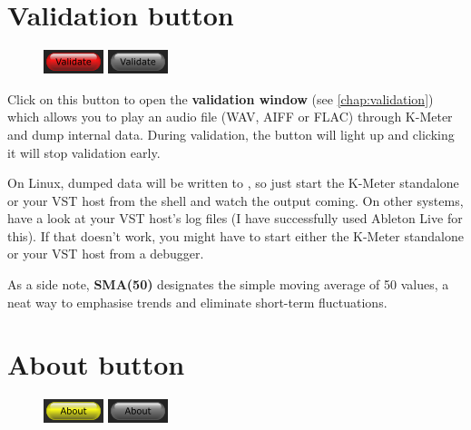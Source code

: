\section{Validation button}
\label{sec:validation_button}

\begin{figure}
  \includegraphics[scale=\screenshotscale,clip]{include/images/button_validate_on.png}
  \newline \vspace{-0.9\baselineskip}
  \includegraphics[scale=\screenshotscale,clip]{include/images/button_validate_off.png}
\end{figure}

Click on this button to open the \textbf{validation window} (see
\ref{chap:validation}) which allows you to play an audio file (WAV,
AIFF or FLAC) through K-Meter and dump internal data.  During
validation, the button will light up and clicking it will stop
validation early.

On Linux, dumped data will be written to , so just start
the K-Meter standalone or your VST host from the shell and watch the
output coming.  On other systems, have a look at your VST host's log
files (I have successfully used Ableton Live for this).  If that
doesn't work, you might have to start either the K-Meter standalone or
your VST host from a debugger.

As a side note, \textbf{SMA(50)} designates the simple moving average
of 50 values, a neat way to emphasise trends and eliminate short-term
fluctuations.

\section{About button}

\begin{figure}
  \includegraphics[scale=\screenshotscale,clip]{include/images/button_about_on.png}
  \newline \vspace{-0.9\baselineskip}
  \includegraphics[scale=\screenshotscale,clip]{include/images/button_about_off.png}
\end{figure}

